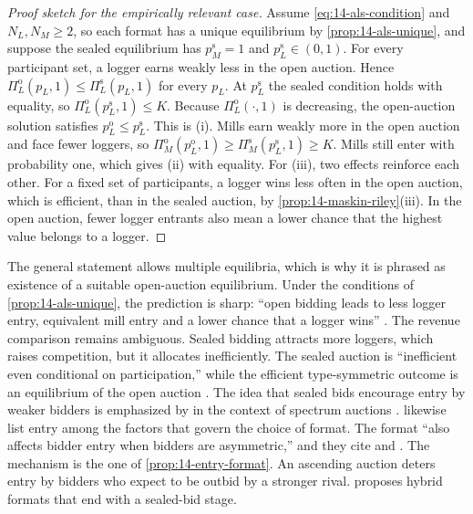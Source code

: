 \begin{proof}[Proof sketch for the empirically relevant case]
Assume \eqref{eq:14-als-condition} and $N_L,N_M\ge 2$, so each format has a unique equilibrium by
\cref{prop:14-als-unique}, and suppose the sealed
equilibrium has $p_M^{\mathrm{s}}=1$ and $p_L^{\mathrm{s}}\in(0,1)$. For every participant set, a
logger earns weakly less in the open auction. Hence $\Pi_L^{\mathrm{o}}(p_L,1)\le\Pi_L^{\mathrm{s}}(p_L,1)$
for every $p_L$. At $p_L^{\mathrm{s}}$ the sealed condition holds with equality, so
$\Pi_L^{\mathrm{o}}(p_L^{\mathrm{s}},1)\le K$. Because $\Pi_L^{\mathrm{o}}(\cdot,1)$ is decreasing,
the open-auction solution satisfies $p_L^{\mathrm{o}}\le p_L^{\mathrm{s}}$. This is (i). Mills earn
weakly more in the open auction and face fewer loggers, so
$\Pi_M^{\mathrm{o}}(p_L^{\mathrm{o}},1)\ge\Pi_M^{\mathrm{s}}(p_L^{\mathrm{s}},1)\ge K$. Mills still enter
with probability one, which gives (ii) with equality. For (iii), two effects reinforce each other.
For a fixed set of participants, a logger wins less often in the open auction, which is efficient,
than in the sealed auction, by \cref{prop:14-maskin-riley}(iii). In the open auction, fewer logger
entrants also mean a lower chance that the highest value belongs to a logger.
\end{proof}

The general statement allows multiple equilibria, which is why it is phrased as existence of a
suitable open-auction equilibrium. Under the conditions of \cref{prop:14-als-unique}, the prediction
is sharp: ``open
bidding leads to less logger entry, equivalent mill entry and a lower chance that a logger wins''
\citep[Section II.D]{AtheyLevinSeira2011}. The revenue comparison remains ambiguous. Sealed bidding
attracts more loggers, which raises competition, but it allocates inefficiently. The sealed auction is
``inefficient even conditional on participation,'' while the efficient type-symmetric outcome is an
equilibrium of the open auction \citep[Section II.D, citing \citealp{AtheyLevinSeira2004}]{AtheyLevinSeira2011}. The idea that sealed bids
encourage entry by weaker bidders is emphasized by \citet{Klemperer2004} in the context of spectrum
auctions \citep[footnote~4, p.~215]{AtheyLevinSeira2011}. \citet[Section~7]{AtheyHaile2007} likewise
list entry among the factors that govern the choice of format. The format ``also affects bidder entry
when bidders are asymmetric,'' and they cite \citet{Klemperer2002} and \citet{AtheyLevinSeira2004}. The
mechanism is the one of \cref{prop:14-entry-format}. An ascending auction deters entry by bidders who
expect to be outbid by a stronger rival.
\citet{Klemperer2002} proposes hybrid formats that end with a sealed-bid stage.


